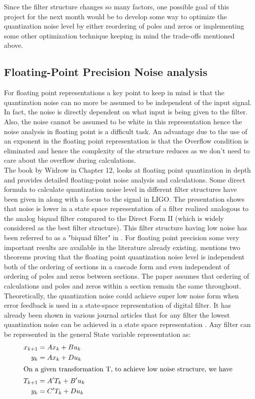 \documentclass[colorlinks=true,pdfstartview=FitV,linkcolor=blue,
            citecolor=red,urlcolor=magenta]{ligodoc}
\begin{document}
Since the filter structure changes so many factors, one possible goal of this project for the next month would be to develop some way to optimize the quantization noise level by either reordering of poles and zeros \cite{Dehner} or implementing some other optimization technique keeping in mind the trade-offs mentioned above.

\subsection{Floating-Point Precision Noise analysis}
For floating point representations a key point to keep in mind is that the quantization noise can no more be assumed to be independent of the input signal. In fact, the noise is directly dependent on what input is being given to the filter. Also, the noise cannot be assumed to be white in this representation hence the noise analysis in floating point is a difficult task. An advantage due to the use of an exponent in the floating point representation is that the Overflow condition is eliminated and hence the complexity of the structure reduces as we don't need to care about the overflow during calculations.\\
The book by Widrow in Chapter 12, \cite{FloatingPoint} looks at floating point quantization in depth and provides detailed floating-point noise analysis and calculations. Some direct formula to calculate quantization noise level in different filter structures have been given in \cite{Matts} along with a focus to the signal in LIGO. The presentation \cite{Matts} shows that noise is lower in a state space representation of a filter realized analogous to the analog biquad filter compared to the Direct Form II (which is widely considered as the best filter structure). This filter structure having low noise has been referred to as a "biquad filter" in \cite{Matts}.
For floating point precision some very important results are available in the literature already existing. \cite{Peculiar} mentions two theorems proving that the floating point quantization noise level is independent both of the ordering of sections in a cascade form and even independent of ordering of poles and zeros between sections. The paper assumes that ordering of calculations and poles and zeros within a section remain the same throughout.
Theoretically, the quantization noise could achieve super low noise \cite{StateSpace} form when error feedback is used in a state-space representation of digital filter. It has already been shown in various journal articles that for any filter the lowest quantization noise can be achieved in a state space representation \cite{StateSpace}.
Any filter can be represented in the general State variable representation as:
\begin{align}
x_{k+1} &= Ax_{k} + Bu_{k} \\
y_{k} &= Ax_{k} + Du_{k} \\
\intertext {On a given transformation T, to achieve low noise structure, we have}
T_{k+1} &= A'T_{k} + B'u_{k}\\
y_{k} &= C'T_{k} + Du_{k}
\end{align}
\end{document}
